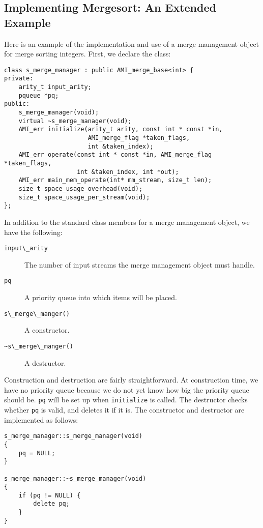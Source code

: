 \subsection{Implementing Mergesort: An Extended Example}
\label{sec:mergesort}

Here is an example of the implementation and use of a merge management
object for merge sorting integers.  First, we declare the class:

\begin{verbatim}
class s_merge_manager : public AMI_merge_base<int> {
private:
    arity_t input_arity;
    pqueue *pq;
public:
    s_merge_manager(void);
    virtual ~s_merge_manager(void);
    AMI_err initialize(arity_t arity, const int * const *in,
                       AMI_merge_flag *taken_flags,
                       int &taken_index);
    AMI_err operate(const int * const *in, AMI_merge_flag *taken_flags,
                    int &taken_index, int *out);
    AMI_err main_mem_operate(int* mm_stream, size_t len);
    size_t space_usage_overhead(void);
    size_t space_usage_per_stream(void);
};
\end{verbatim}

In addition to the standard class members for a merge management
object, we have the following:

\begin{description}
\item[\verb|input\_arity|]
The number of input streams the merge management object must handle.
\item[\verb|pq|]
A priority queue into which items will be placed.
\item[\verb|s\_merge\_manger()|]
A constructor.
\item[\verb|~s\_merge\_manger()|]
A destructor.
\end{description}

Construction and destruction are fairly straightforward.  At
construction time, we have no priority queue because we do not yet
know how big the priority queue should be.  \verb|pq| will be set up
when \verb|initialize| is called.  The destructor checks whether
\verb|pq| is valid, and deletes it if it is.  The constructor and
destructor are implemented as follows:

\begin{verbatim}
s_merge_manager::s_merge_manager(void)
{
    pq = NULL;
}

s_merge_manager::~s_merge_manager(void)
{
    if (pq != NULL) {
        delete pq;
    }
}
\end{verbatim}

